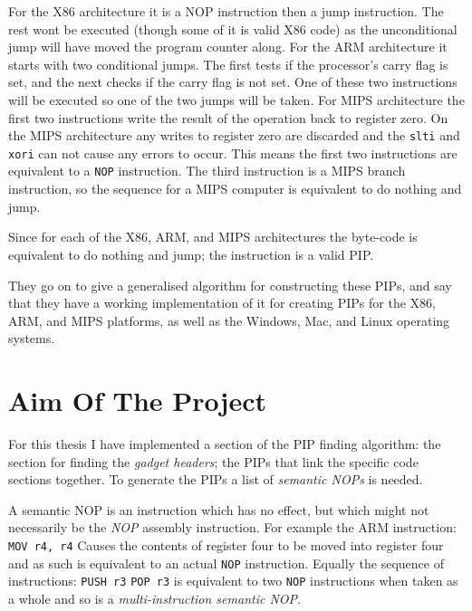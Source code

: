 \documentclass[10pt]{book}
\newenvironment{definition}[1][Definition]{\begin{trivlist}
\item[\hskip \labelsep {\bfseries #1}]}{\end{trivlist}}
\begin{document}
For the X86 architecture it is a NOP instruction then a jump
instruction. The rest wont be executed (though some of it is valid X86
code) as the unconditional jump will have moved the program counter
along. For the ARM architecture it starts with two conditional jumps.
The first tests if the processor's carry flag is set, and the next
checks if the carry flag is not set. One of these two instructions will
be executed so one of the two jumps will be taken. For MIPS architecture
the first two instructions write the result of the operation back to
register zero. On the MIPS architecture any writes to register zero are
discarded and the \lstinline!slti! and \lstinline!xori! can not cause
any errors to occur. This means the first two instructions are
equivalent to a \lstinline!NOP! instruction. The third instruction is a
MIPS branch instruction, so the sequence for a MIPS computer is
equivalent to do nothing and jump.

Since for each of the X86, ARM, and MIPS architectures the byte-code is
equivalent to do nothing and jump; the instruction is a valid PIP.

They go on to give a generalised algorithm for constructing these PIPs,
and say that they have a working implementation of it for creating PIPs
for the X86, ARM, and MIPS platforms, as well as the Windows, Mac, and
Linux operating systems.

\section{Aim Of The Project}

For this thesis I have implemented a section of the PIP finding
algorithm: the section for finding the \emph{gadget headers}; the PIPs
that link the specific code sections together. To generate the PIPs a
list of \emph{semantic NOPs} is needed.

\begin{definition}
  A semantic NOP is an instruction
  which has no effect, but which might not necessarily be the \emph{NOP}
  assembly instruction. For example the ARM instruction:
  \lstinline!MOV r4, r4! Causes the contents of register four to be
  moved into register four and as such is equivalent to an actual
  \lstinline!NOP! instruction. Equally the sequence of instructions:
  \lstinline!PUSH r3! \lstinline!POP r3! is equivalent to two
  \lstinline!NOP! instructions when taken as a whole and so is a
  \emph{multi-instruction semantic NOP}.
\end{definition} 
  
\end{document}
